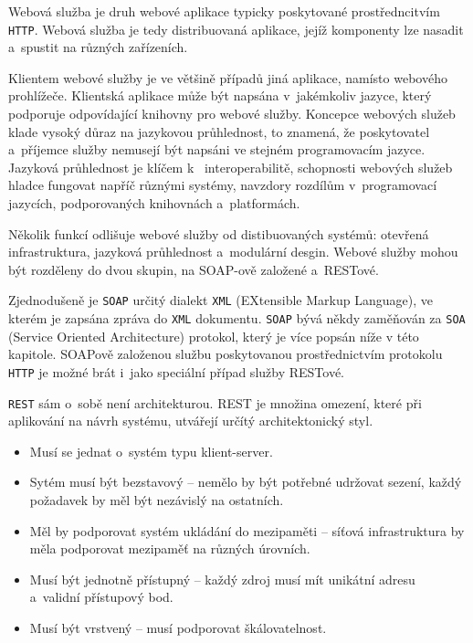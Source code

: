 \documentclass[twoside, 12pt]{article}
\begin{document}
{

Webová služba je druh webové aplikace typicky poskytované prostředncitvím \texttt{HTTP}. \cite{kalin}
Webová služba je tedy distribuovaná aplikace, jejíž komponenty lze nasadit a~spustit na různých zařízeních.

Klientem webové služby je ve většině případů jiná aplikace, namísto webového prohlížeče.
Klientská aplikace může být napsána v~jakémkoliv jazyce, který podporuje
odpovídající knihovny pro webové služby.
Koncepce webových služeb klade vysoký důraz na jazykovou průhlednost,
to znamená, že poskytovatel a~příjemce služby nemusejí být napsáni
ve stejném programovacím jazyce.
Jazyková průhlednost je klíčem k~ interoperabilitě,
schopnosti webových služeb hladce fungovat napříč různými systémy,
navzdory rozdílům v~programovací jazycích,
podporovaných knihovnách a~platformách.

Několik funkcí odlišuje webové služby od distibuovaných systémů: otevřená infrastruktura,
jazyková průhlednost a~modulární desgin.
Webové služby mohou být rozděleny do dvou skupin, na SOAP-ově založené a~RESTové.


Zjednodušeně je \texttt{SOAP} určitý dialekt \texttt{XML}
(EXtensible Markup Language), ve kterém je zapsána zpráva do \texttt{XML} dokumentu.
\texttt{SOAP} bývá někdy zaměňován za \texttt{SOA} (Service Oriented Architecture) protokol,
který je více popsán níže v této kapitole.
SOAPově založenou službu poskytovanou prostřednictvím protokolu \texttt{HTTP}
je možné brát i~jako speciální případ služby RESTové.
\cite{kalin}


\texttt{REST} sám o~sobě není architekturou. REST je množina omezení,
které při aplikování na návrh systému, utvářejí určítý architektonický styl.
\cite{sandoval}

\bigskip

\begin{itemize}
\item Musí se jednat o~systém typu klient-server.
\item Sytém musí být bezstavový -- nemělo by být potřebné udržovat sezení, každý požadavek by měl být nezávislý na ostatních.
\item Měl by podporovat systém ukládání do mezipaměti -- síťová infrastruktura by měla podporovat mezipaměť na různých úrovních.
\item Musí být jednotně přístupný -- každý zdroj musí mít unikátní adresu a~validní přístupový bod.
\item Musí být vrstvený -- musí podporovat škálovatelnost.
\end{itemize}

}
\end{document}
